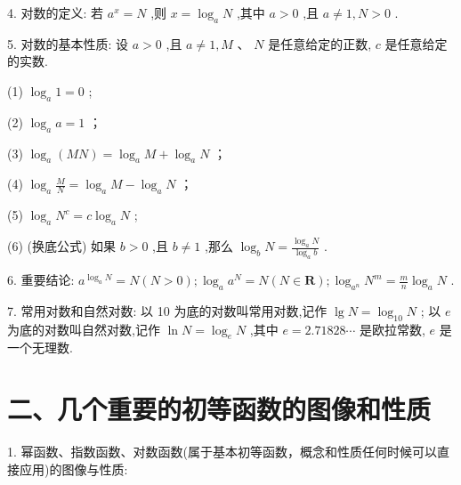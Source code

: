 4. 对数的定义: 若 ${a}^{x} = N$ ,则 $x = {\log }_{a}N$ ,其中 $a > 0$ ,且 $a \neq  1,N > 0$ .

5. 对数的基本性质: 设 $a > 0$ ,且 $a \neq  1,M\text{ 、 }N$ 是任意给定的正数, $c$ 是任意给定的实数.

(1) ${\log }_{a}1 = 0$ ;

(2) ${\log }_{a}a = 1$ ；

(3) ${\log }_{a}\left( {MN}\right)  = {\log }_{a}M + {\log }_{a}N$ ；

(4) ${\log }_{a}\frac{M}{N} = {\log }_{a}M - {\log }_{a}N$ ；

(5) ${\log }_{a}{N}^{c} = c{\log }_{a}N$ ;

(6) (换底公式) 如果 $b > 0$ ,且 $b \neq  1$ ,那么 ${\log }_{b}N = \frac{{\log }_{a}N}{{\log }_{a}b}$ .

6. 重要结论: ${a}^{{\log }_{a}N} = N\left( {N > 0}\right) ;{\log }_{a}{a}^{N} = N\left( {N \in  \mathbf{R}}\right) ;{\log }_{{a}^{n}}{N}^{m} = \frac{m}{n}{\log }_{a}N$ .

7. 常用对数和自然对数: 以 10 为底的对数叫常用对数,记作 $\lg N = {\log }_{10}N$ ; 以 ${e}$ 为底的对数叫自然对数,记作 $\ln N = {\log }_{{e}}N$ ,其中 ${e} = {2.71828}\cdots$ 是欧拉常数, ${e}$ 是一个无理数.

\section*{二、几个重要的初等函数的图像和性质}

1. 幂函数、指数函数、对数函数(属于基本初等函数，概念和性质任何时候可以直接应用)的图像与性质:

